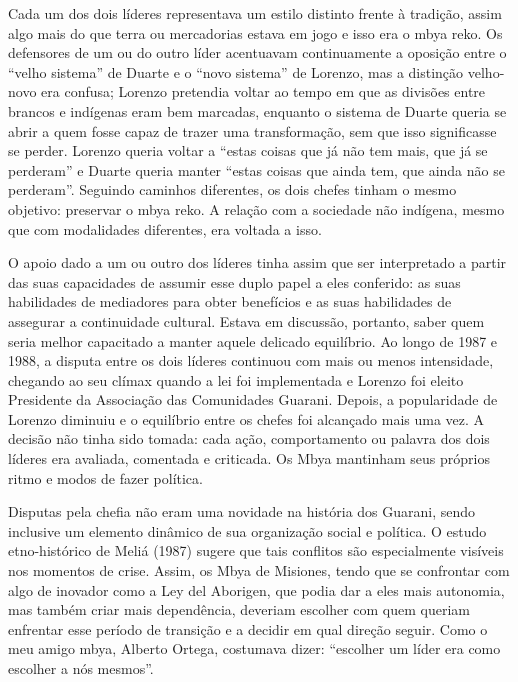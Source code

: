 \documentclass{article}
\begin{document}
Cada um dos dois l\'ideres representava um estilo distinto frente \`a
tradi\c{c}\~ao, assim algo mais do que terra ou mercadorias estava em
jogo e isso era o mbya reko. Os defensores de um ou do outro l\'ider
acentuavam continuamente a oposi\c{c}\~ao entre o
{\textquotedblleft}velho sistema{\textquotedblright} de Duarte e o
{\textquotedblleft}novo sistema{\textquotedblright} de Lorenzo, mas a
distin\c{c}\~ao velho-novo era confusa; Lorenzo pretendia voltar ao
tempo em que as divis\~oes entre brancos e ind\'igenas eram  bem
marcadas, enquanto o sistema de Duarte queria se abrir a quem fosse
capaz de trazer uma transforma\c{c}\~ao, sem que isso significasse se
perder. Lorenzo queria voltar a {\textquotedblleft}estas coisas que
j\'a n\~ao tem mais, que j\'a se perderam{\textquotedblright} e Duarte
queria manter {\textquotedblleft}estas coisas que ainda tem, que ainda
n\~ao se perderam{\textquotedblright}. Seguindo caminhos  diferentes,
os dois chefes tinham o mesmo objetivo: preservar o mbya reko. A
rela\c{c}\~ao com a sociedade n\~ao ind\'igena, mesmo que com
modalidades diferentes, era voltada a isso.

O apoio dado a um ou outro dos l\'ideres tinha assim que ser
interpretado a partir das suas capacidades de assumir esse duplo papel
a eles conferido: as suas habilidades de mediadores para obter
benef\'icios e as suas habilidades de assegurar a continuidade
cultural. Estava em discuss\~ao, portanto, saber quem seria melhor
capacitado a manter aquele delicado equil\'ibrio. Ao longo de 1987 e
1988, a disputa entre os dois l\'ideres continuou com mais ou menos
intensidade, chegando ao seu cl\'imax quando a lei foi implementada e
Lorenzo foi eleito Presidente da Associa\c{c}\~ao das Comunidades
Guarani. Depois, a popularidade de Lorenzo diminuiu e o equil\'ibrio
entre os chefes foi alcan\c{c}ado mais uma vez. A decis\~ao n\~ao tinha
sido tomada: cada a\c{c}\~ao, comportamento ou palavra dos dois
l\'ideres era avaliada, comentada e criticada. Os Mbya mantinham seus
pr\'oprios ritmo e modos de fazer pol\'itica. 

Disputas pela chefia n\~ao eram uma novidade na hist\'oria dos Guarani,
sendo inclusive um elemento din\^amico de sua organiza\c{c}\~ao social
e pol\'itica. O estudo etno-hist\'orico de Meli\'a (1987) sugere que
tais conflitos s\~ao especialmente vis\'iveis nos momentos de crise.
Assim, os Mbya de Misiones, tendo que se confrontar com algo de
inovador como a Ley del Aborigen, que podia dar a eles mais autonomia,
mas tamb\'em criar mais depend\^encia, deveriam escolher com quem
queriam enfrentar esse per\'iodo de transi\c{c}\~ao e a decidir em qual
dire\c{c}\~ao seguir. Como o meu amigo mbya, Alberto Ortega, costumava
dizer: {\textquotedblleft}escolher um l\'ider era como escolher a n\'os
mesmos{\textquotedblright}.
\end{document}
